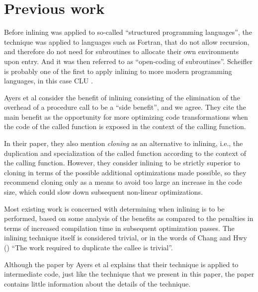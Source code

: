 \section{Previous work}

Before inlining was applied to so-called ``structured programming
languages'', the technique was applied to languages such as Fortran,
that do not allow recursion, and therefore do not need for subroutines
to allocate their own environments upon entry.  And it was then
referred to as ``open-coding of subroutines''.  Scheifler
\cite{Scheifler:1977:AIS:359810.359830} is probably one of the first
to apply inlining to more modern programming languages, in this case
CLU \cite{Liskov:1977:AMC:359763.359789}.

Ayers et al \cite{Ayers:1997:AI:258915.258928} consider the benefit of
inlining consisting of the elimination of the overhead of a procedure
call to be a ``side benefit'', and we agree.  They cite the main
benefit as the opportunity for more optimizing code transformations
when the code of the called function is exposed in the context of the
calling function.

In their paper, they also mention \emph{cloning} as an alternative to
inlining, i.e., the duplication and specialization of the called
function according to the context of the calling function.  However,
they consider inlining to be strictly superior to cloning in terms of
the possible additional optimizations made possible, so they recommend
cloning only as a means to avoid too large an increase in the code
size, which could slow down subsequent non-linear optimizations.

Most existing work is concerned with determining when inlining is to
be performed, based on some analysis of the benefits as compared to
the penalties in terms of increased compilation time in subsequent
optimization passes.  The inlining technique itself is considered
trivial, or in the words of Chang and Hwy
(\cite{Chang:1989:IFE:73141.74840, Chang:1989:IFE:74818.74840}) ``The
work required to duplicate the callee is trivial''.

Although the paper by Ayers et al explains that their technique is
applied to intermediate code, just like the technique that we present
in this paper, the paper contains little information about the details
of the technique.

